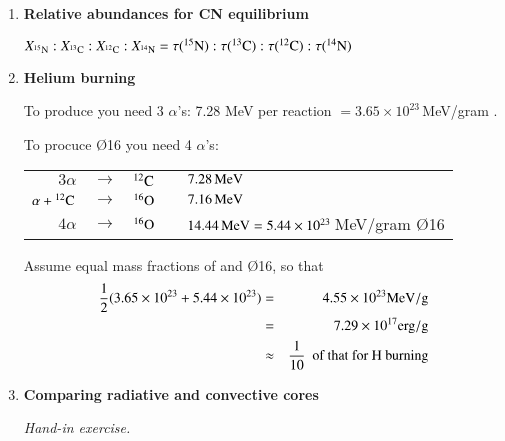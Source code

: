 \documentclass[11pt,a4paper]{report}
\begin{document}
\begin{enumerate}
\item {\bf Relative abundances for CN equilibrium}

  $X_{{^{15}\mathrm{N}}} : X_{{^{13}\mathrm{C}}} : X_{{^{12}\mathrm{C}}} : X_{{^{14}\mathrm{N}}} = \tau({^{15}\mathrm{N}}) :
  \tau({^{13}\mathrm{C}}) : \tau({^{12}\mathrm{C}}) : \tau({^{14}\mathrm{N}}) $



\item {\bf Helium burning}

  To produce  you need 3 $\alpha$'s: 7.28 MeV per reaction $=
  3.65 \times 10^{23}$\,MeV/gram .

  To procuce \O{16} you need 4 $\alpha$'s:

  \begin{tabular}{rclcl}
    $3 \alpha$ &$\rightarrow$&$ ^{12}\rm{C}$ && $7.28\,\rm{MeV}$\\
    $ \alpha +  {^{12}\mathrm{C}}$&$\rightarrow$&$ ^{16}\rm{O}$ && $7.16\,\rm{MeV}$\\
    \hline
    $4 \alpha $&$\rightarrow$ & $ ^{16}\rm{O}$ && $14.44\,\rm{MeV} 
    = 5.44 \times 10^{23}$\,MeV/gram \O{16}
  \end{tabular}
  
  Assume equal mass fractions of  and \O{16}, so that
  \begin{eqnarray}
    \frac{1}{2} (3.65\times10^{23} + 5.44\times10^{23}) 
    &=& 4.55\times10^{23} \rm{MeV/g}\nonumber \\
    &=& 7.29\times10^{17} \rm{erg/g}\nonumber \\
    &\approx& \frac{1}{10} \text{~ of that for H burning} \nonumber
  \end{eqnarray}
  

\item {\bf Comparing radiative and convective cores}

  \emph{Hand-in exercise.}


\end{enumerate}
\end{document}
